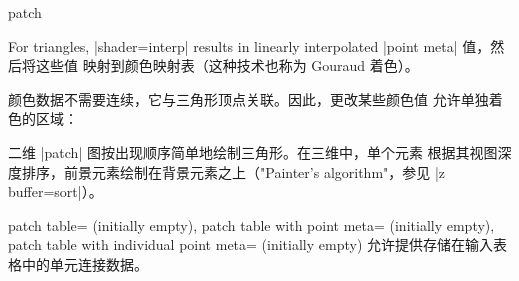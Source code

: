{\begin{plottype}[/pgfplots]{patch}
\begin{codeexample}[]
\end{codeexample}
    \noindent For triangles, |shader=interp| results in linearly interpolated
        |point meta| 值，然后将这些值
        映射到颜色映射表（这种技术也称为 Gouraud 着色）。

    颜色数据不需要连续，它与三角形顶点关联。因此，更改某些颜色值
    允许单独着色的区域：
\begin{codeexample}[]
\end{codeexample}

    二维 |patch| 图按出现顺序简单地绘制三角形。在三维中，单个元素
    根据其视图深度排序，前景元素绘制在背景元素之上（"Painter's
    algorithm"，参见 |z buffer=sort|）。

    \begin{pgfplotskeylist}{%
        patch table= (initially empty),
        patch table with point meta= (initially empty),
        patch table with individual point meta= (initially empty)%
    }
        允许提供存储在输入表格中的单元连接数据。


\end{pgfplotskeylist}
\end{plottype}}
